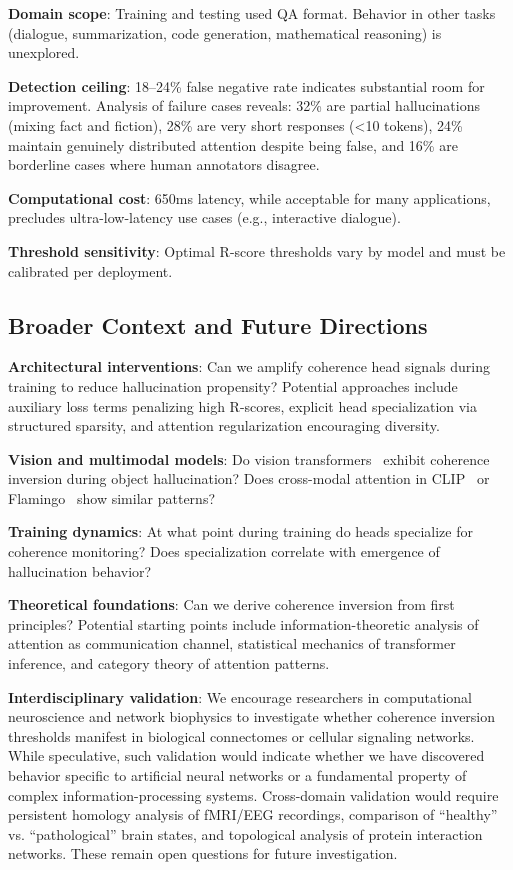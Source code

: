 \documentclass[11pt,twocolumn]{article}
\begin{document}
\textbf{Domain scope}: Training and testing used QA format. Behavior in other tasks (dialogue, summarization, code generation, mathematical reasoning) is unexplored.

\textbf{Detection ceiling}: 18--24\% false negative rate indicates substantial room for improvement. Analysis of failure cases reveals: 32\% are partial hallucinations (mixing fact and fiction), 28\% are very short responses (<10 tokens), 24\% maintain genuinely distributed attention despite being false, and 16\% are borderline cases where human annotators disagree.

\textbf{Computational cost}: 650ms latency, while acceptable for many applications, precludes ultra-low-latency use cases (e.g., interactive dialogue).

\textbf{Threshold sensitivity}: Optimal R-score thresholds vary by model and must be calibrated per deployment.

\subsection{Broader Context and Future Directions}

\textbf{Architectural interventions}: Can we amplify coherence head signals during training to reduce hallucination propensity? Potential approaches include auxiliary loss terms penalizing high R-scores, explicit head specialization via structured sparsity, and attention regularization encouraging diversity.

\textbf{Vision and multimodal models}: Do vision transformers~\cite{dosovitskiy2020image} exhibit coherence inversion during object hallucination? Does cross-modal attention in CLIP~\cite{radford2021learning} or Flamingo~\cite{alayrac2022flamingo} show similar patterns?

\textbf{Training dynamics}: At what point during training do heads specialize for coherence monitoring? Does specialization correlate with emergence of hallucination behavior?

\textbf{Theoretical foundations}: Can we derive coherence inversion from first principles? Potential starting points include information-theoretic analysis of attention as communication channel, statistical mechanics of transformer inference, and category theory of attention patterns.

\textbf{Interdisciplinary validation}: We encourage researchers in computational neuroscience and network biophysics to investigate whether coherence inversion thresholds manifest in biological connectomes or cellular signaling networks. While speculative, such validation would indicate whether we have discovered behavior specific to artificial neural networks or a fundamental property of complex information-processing systems. Cross-domain validation would require persistent homology analysis of fMRI/EEG recordings, comparison of ``healthy'' vs. ``pathological'' brain states, and topological analysis of protein interaction networks. These remain open questions for future investigation.
\end{document}
